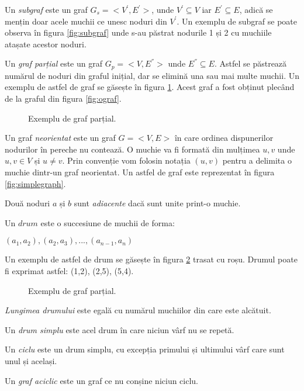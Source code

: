 Un \textit{subgraf} este un graf $G_{s}=<V^{'},E^{'}>$, unde $V^{'}\subseteq V$ iar $E^{'}\subseteq E$, adică se mențin doar acele muchii ce unesc noduri din $V^{'}$. Un exemplu de subgraf se poate observa în figura \ref{fig:subgraf} unde s-au păstrat nodurile 1 și 2 cu muchiile atașate acestor noduri.

Un \textit{graf parțial} este un graf $G_{p}=<V,E^{''}>$ unde  $E^{''}\subseteq E$. Astfel se păstrează numărul de noduri din graful inițial, dar se elimină una sau mai multe muchii. Un exemplu de astfel de graf se găsește în figura \ref{fig:partialgraph}. Acest graf a fost obținut plecând de la graful din figura \ref{fig:ograf}.

\begin{figure}[H] 
	\centering	
	{
	}
	\caption{Exemplu de graf parțial.} 
	\label{fig:partialgraph}
\end{figure}

Un graf \textit{neorientat} este un graf $G=<V,E>$ în care ordinea dispunerilor nodurilor în pereche nu contează. O muchie va fi formată din mulțimea ${u,v}$ unde $u,v \in V$ și $u \neq v$. Prin convenție vom folosin notația $(u,v)$ pentru a delimita o muchie dintr-un graf neorientat. Un astfel de graf este reprezentat în figura \ref{fig:simplegraph}.

Două noduri $a$ și $b$ sunt \textit{adiacente} dacă sunt unite print-o muchie. 

Un $drum$ este o succesiune de muchii de forma:

$(a_1,a_2), (a_2,a_3), ..., (a_{n-1},a_n)$

Un exemplu de astfel de drum se găsește în figura \ref{fig:drum} trasat cu roșu. Drumul poate fi exprimat astfel: (1,2), (2,5), (5,4).

\begin{figure}[H] 
	\centering	
	{
	}
	\caption{Exemplu de graf parțial.} 
	\label{fig:drum}
\end{figure}

\textit{Lungimea drumului} este egală cu numărul muchiilor din care este alcătuit.

Un \textit{drum simplu} este acel drum în care niciun vârf nu se repetă.

Un \textit{ciclu} este un drum simplu, cu excepția primului și ultimului vârf care sunt unul și același.

Un \textit{graf aciclic} este un graf ce nu conșine niciun ciclu.

